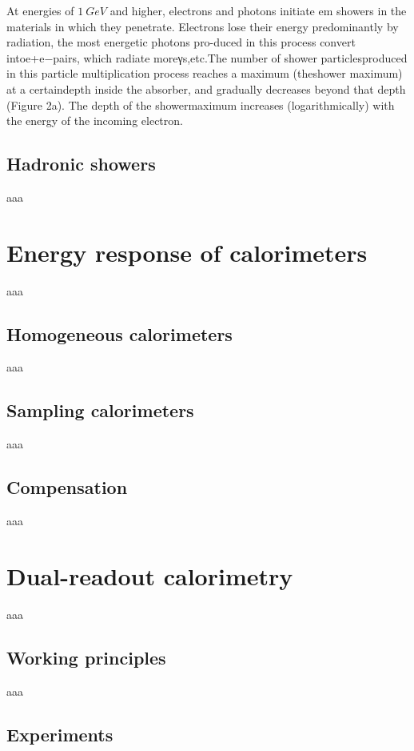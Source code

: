 At energies of $1\ GeV$ and higher, electrons and photons initiate em showers in the materials in which they penetrate. Electrons lose their energy predominantly by radiation, the most energetic photons pro-duced in this process convert intoe+e−pairs, which radiate moreγs,etc.The number of shower particlesproduced in this particle multiplication process reaches a maximum (theshower maximum) at a certaindepth inside the absorber, and gradually decreases beyond that depth (Figure 2a). The depth of the showermaximum increases (logarithmically) with the energy of the incoming electron. 



\subsection{Hadronic showers} \label{subsec:had_shower}
aaa

\section{Energy response of calorimeters}
aaa

\subsection{Homogeneous calorimeters}
aaa

\subsection{Sampling calorimeters}
aaa

\subsection{Compensation}
aaa

\section{Dual-readout calorimetry}
aaa

\subsection{Working principles}
aaa

\subsection{Experiments}